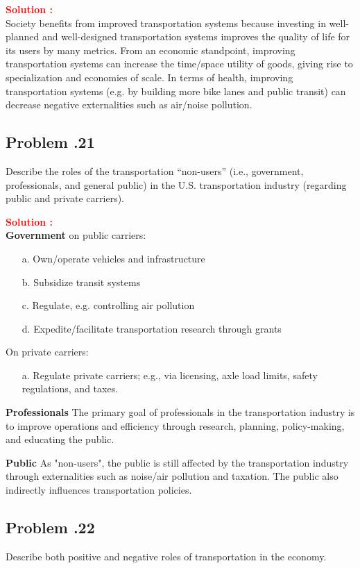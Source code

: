 \documentclass[12pt]{article}
\newcommand{\customsubsection}[1]{
  \subsection*{Problem \thesection.#1}
}
\begin{document}
\textbf{\textcolor{red}{Solution :}} \\
Society benefits from improved transportation systems because investing in well-planned and well-designed transportation systems improves the quality of life for its users by many metrics. From an economic standpoint, improving transportation systems can increase the time/space utility of goods, giving rise to specialization and economies of scale. In terms of health, improving transportation systems (e.g. by building more bike lanes and public transit) can decrease negative externalities such as air/noise pollution. 
\newpage


\customsubsection{21}
Describe the roles of the transportation “non-users” (i.e., government, professionals, and general public) in the U.S. transportation industry (regarding public and private carriers). 


\textbf{\textcolor{red}{Solution :}} \\
\textbf{Government}
on public carriers:
\begin{itemize}
    \item [a.] Own/operate vehicles and infrastructure
    \item[b.] Subsidize transit systems
    \item[c.] Regulate, e.g. controlling air pollution
    \item[d.] Expedite/facilitate transportation research through grants 
\end{itemize}

On private carriers:
\begin{itemize}
    \item [a.] Regulate private carriers; e.g., via licensing, axle load limits, safety regulations, and taxes.
\end{itemize}

\textbf{Professionals}
The primary goal of professionals in the transportation industry is to improve operations and efficiency through research, planning, policy-making, and educating the public. 

\textbf{Public} As "non-users", the public is still affected by the transportation industry through externalities such as noise/air pollution and taxation. The public also indirectly influences transportation policies.

\newpage
   


\customsubsection{22}
Describe both positive and negative roles of transportation in the economy. 
\end{document}
